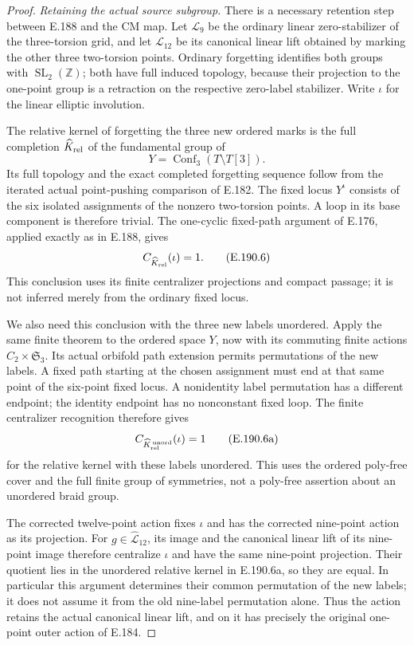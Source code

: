 \begin{proof}
\emph{Retaining the actual source subgroup.}
There is a necessary retention step between E.188 and the
CM map.  Let \(\mathcal L_9\) be the ordinary linear
zero-stabilizer of the three-torsion grid, and let
\(\mathcal L_{12}\) be its canonical linear lift obtained
by marking the other three two-torsion points.
Ordinary forgetting identifies both groups with
\(\operatorname{SL}_2(\mathbb Z)\); both have full induced
topology, because their projection to the one-point group
is a retraction on the respective zero-label stabilizer.
Write \(\iota\) for the linear elliptic involution.

The relative kernel of forgetting the three new ordered
marks is the full completion \(\widehat K_{\rm rel}\) of
the fundamental group of
\[
       Y=\operatorname{Conf}_3(T\setminus T[3]).
\tag{E.190.5}
\]
Its full topology and the exact completed forgetting
sequence follow from the iterated actual point-pushing
comparison of E.182.  The fixed locus \(Y^\iota\) consists
of the six isolated assignments of the nonzero
two-torsion points.  A loop in its base component is
therefore trivial.  The one-cyclic fixed-path argument
of E.176, applied exactly as in E.188, gives
\[
                 C_{\widehat K_{\rm rel}}(\iota)=1.
\tag{E.190.6}
\]
This conclusion uses its finite centralizer projections
and compact passage; it is not inferred merely from the
ordinary fixed locus.

We also need this conclusion with the three new labels
unordered.  Apply the same finite theorem to the ordered
space \(Y\), now with its commuting finite actions
\(C_2\times\mathfrak S_3\).  Its actual orbifold path
extension permits permutations of the new labels.
A fixed path starting at the chosen assignment must
end at that same point of the six-point fixed locus.
A nonidentity label permutation has a different
endpoint; the identity endpoint has no nonconstant
fixed loop.  The finite centralizer recognition
therefore gives
\[
       C_{\widehat K_{\rm rel}^{\,\rm unord}}(\iota)=1
\tag{E.190.6a}
\]
for the relative kernel with these labels unordered.
This uses the ordered poly-free cover and the full
finite group of symmetries, not a poly-free assertion
about an unordered braid group.

The corrected twelve-point action fixes \(\iota\) and
has the corrected nine-point action as its projection.
For \(g\in\widehat{\mathcal L}_{12}\), its image and
the canonical linear lift of its nine-point image
therefore centralize \(\iota\) and have the same
nine-point projection.  Their quotient lies in the
unordered relative kernel in E.190.6a, so they are equal.
In particular this argument determines their common
permutation of the new labels; it does not assume it
from the old nine-label permutation alone.
Thus the action retains the actual canonical linear
lift, and on it has precisely the original one-point
outer action of E.184.


\end{proof}
